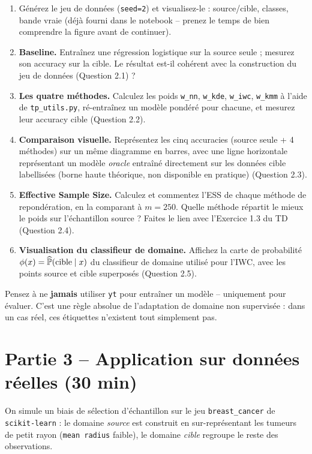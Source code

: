 \documentclass[11pt]{article}
\begin{document}
\begin{enumerate}
\item Générez le jeu de données (\texttt{seed=2}) et visualisez-le : source/cible, classes,
bande vraie (déjà fourni dans le notebook -- prenez le temps de bien comprendre la figure avant de
continuer).
\item \textbf{Baseline.} Entraînez une régression logistique sur la source seule ; mesurez son
accuracy sur la cible. Le résultat est-il cohérent avec la construction du jeu de données
(Question 2.1) ?
\item \textbf{Les quatre méthodes.} Calculez les poids \texttt{w\_nn}, \texttt{w\_kde},
\texttt{w\_iwc}, \texttt{w\_kmm} à l'aide de \texttt{tp\_utils.py}, ré-entraînez un modèle pondéré
pour chacune, et mesurez leur accuracy cible (Question 2.2).
\item \textbf{Comparaison visuelle.} Représentez les cinq accuracies (source seule + 4 méthodes)
sur un même diagramme en barres, avec une ligne horizontale représentant un modèle \emph{oracle}
entraîné directement sur les données cible labellisées (borne haute théorique, non disponible en
pratique) (Question 2.3).
\item \textbf{Effective Sample Size.} Calculez et commentez l'ESS de chaque méthode de
repondération, en la comparant à $m=250$. Quelle méthode répartit le mieux le poids sur
l'échantillon source ? Faites le lien avec l'Exercice 1.3 du TD (Question 2.4).
\item \textbf{Visualisation du classifieur de domaine.} Affichez la carte de probabilité
$\phi(x)=\widehat\P(\text{cible}\mid x)$ du classifieur de domaine utilisé pour l'IWC, avec les
points source et cible superposés (Question 2.5).
\end{enumerate}

\begin{pitfall}
Pensez à ne \textbf{jamais} utiliser \texttt{yt} pour entraîner un modèle -- uniquement pour
évaluer. C'est une règle absolue de l'adaptation de domaine non supervisée : dans un cas réel, ces
étiquettes n'existent tout simplement pas.
\end{pitfall}

\section{Partie 3 -- Application sur données réelles (30 min)}

On simule un biais de sélection d'échantillon sur le jeu \texttt{breast\_cancer} de
\texttt{scikit-learn} : le domaine \emph{source} est construit en sur-représentant les tumeurs de
petit rayon (\texttt{mean radius} faible), le domaine \emph{cible} regroupe le reste des
observations.
\end{document}
